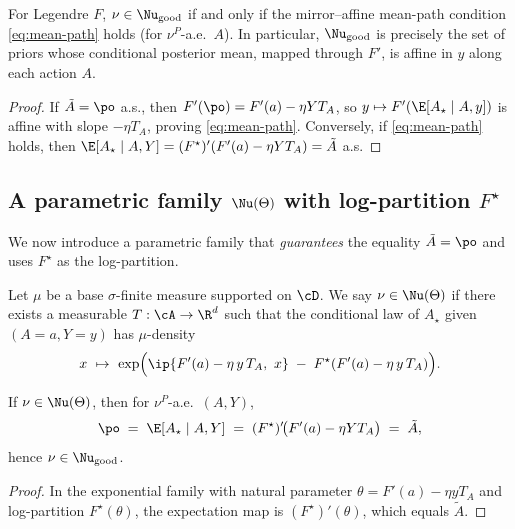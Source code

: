 \begin{proposition}
    \label{prop:Nu-good-iff}
    For Legendre $F$, $\nu\in\Nu_{\text{good}}$ if and only if the mirror–affine mean-path condition \eqref{eq:mean-path} holds (for $\nu^P$-a.e.\ $A$). In particular, $\Nu_{\text{good}}$ is precisely the set of priors whose conditional posterior mean, mapped through $F'$, is affine in $y$ along each action $A$.
\end{proposition}
\begin{proof}
    If $\tilde A=\po$ a.s., then $F'(\po)=F'(a)-\eta Y T_A$, so $y\mapsto F'(\E[A_\star\mid A,y])$ is affine with slope $-\eta T_A$, proving \eqref{eq:mean-path}. Conversely, if \eqref{eq:mean-path} holds, then $\E[A_\star\mid A,Y]= (F^\star)'(F'(a)-\eta Y T_A)=\tilde A$ a.s.
\end{proof}

\subsection{A parametric family \texorpdfstring{$\Nu(\Theta)$}{Nu(Theta)} with log-partition \texorpdfstring{$F^\star$}{F*}}
We now introduce a parametric family that \emph{guarantees} the equality $\tilde A=\po$ and uses $F^\star$ as the log-partition.

\begin{definition}
    \label{def:mirror-exponential}
    Let $\mu$ be a base $\sigma$-finite measure supported on $\cD$. We say $\nu\in\Nu(\Theta)$ if there exists a measurable $T:\cA\to\R^d$ such that the conditional law of $A_\star$ given $(A=a,Y=y)$ has $\mu$-density
    \begin{equation}
        \label{eq:mirror-exp-density}
        x\ \mapsto\ \exp\!\Big( \ip{F'(a)-\eta\,y\,T_A,\ x}\;-\;F^\star(F'(a)-\eta\,y\,T_A)\Big).
    \end{equation}
\end{definition}

\begin{proposition}
    \label{prop:NuTheta-in-Nugood}
    If $\nu\in\Nu(\Theta)$, then for $\nu^P$-a.e.\ $(A,Y)$,
    \[
        \po \;=\; \E[A_\star\mid A,Y] \;=\; (F^\star)'\!\big(F'(a)-\eta Y T_A\big) \;=\; \tilde A,
    \]
    hence $\nu\in\Nu_{\text{good}}$.
\end{proposition}
\begin{proof}
    In the exponential family with natural parameter $\theta=F'(a)-\eta y T_A$ and log-partition $F^\star(\theta)$, the expectation map is $(F^\star)'(\theta)$, which equals $\tilde A$.
\end{proof}

